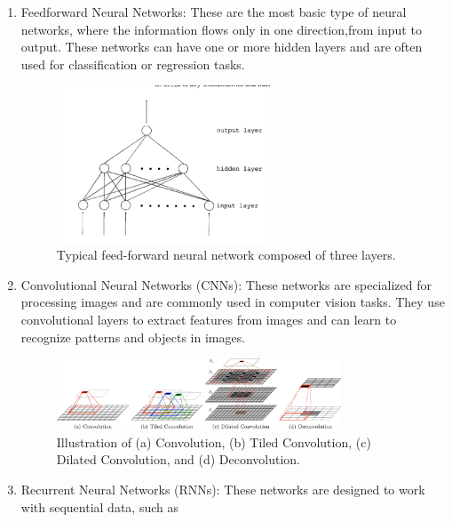 \begin{enumerate}
    \item Feedforward Neural Networks: These are the most basic type of neural networks, where the information flows
    only in one direction,from input to output. These networks can have one or more hidden layers and are often used
    for classification or regression tasks.
    \newpage
    \begin{center}
        \begin{figure}[!ht]
            \centering
            \includegraphics[width=0.6\textwidth]{figures/ff}
            \caption{Typical feed-forward neural network composed of three layers. \cite{SVOZIL199743}}
            \label{fig:ff}
        \end{figure}
    \end{center}
    \item Convolutional Neural Networks (CNNs): These networks are specialized for processing images and are commonly
    used in computer vision tasks. They use convolutional layers to extract features from images and can learn to
    recognize patterns and objects in images.
    \begin{center}
        \begin{figure}[!ht]
            \centering
            \includegraphics[width=0.8\textwidth]{figures/cn}
            \caption{Illustration of (a) Convolution, (b) Tiled Convolution, (c) Dilated Convolution, and (d)
                Deconvolution. \cite{GU2018354}}
            \label{fig:cn}
        \end{figure}
    \end{center}
    \item Recurrent Neural Networks (RNNs): These networks are designed to work with sequential data, such as

\end{enumerate}
